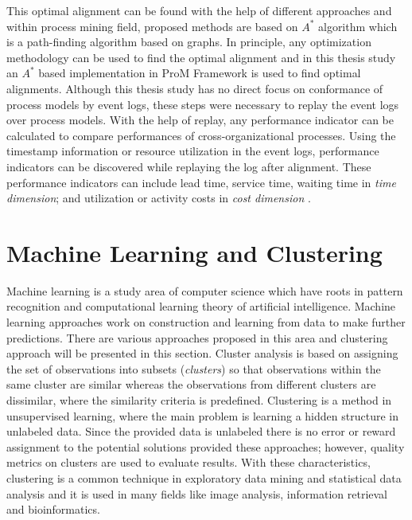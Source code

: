 This optimal alignment can be found with the help of different approaches and within process mining field, proposed methods \cite{adriansyah2011conformance} \cite{adriansyah2011towards} are based on $A^{*}$ algorithm which is a path-finding algorithm based on graphs. In principle, any optimization methodology can be used to find the optimal alignment and in this thesis study an $A^{*}$ based implementation in ProM Framework \cite{verbeek2010prom} is used to find optimal alignments. Although this thesis study has no direct focus on conformance of process models by event logs, these steps were necessary to replay the event logs over process models. With the help of replay, any performance indicator can be calculated to compare performances of cross-organizational processes. Using the timestamp information or resource utilization in the event logs, performance indicators can be discovered while replaying the log after alignment. These performance indicators can include lead time, service time, waiting time in \textit{time dimension}; and utilization or activity costs in \textit{cost dimension} \cite{van2011process}.

\section{Machine Learning and Clustering}
\label{sec:unsupervised-learning}
Machine learning is a study area of computer science which have roots in pattern recognition and computational learning theory of artificial intelligence. Machine learning approaches work on construction and learning from data to make further predictions. There are various approaches proposed in this area and clustering approach will be presented in this section. Cluster analysis is based on assigning the set of observations into subsets (\textit{clusters}) so that observations within the same cluster are similar whereas the observations from different clusters are dissimilar, where the similarity criteria is predefined. Clustering is a method in unsupervised learning, where the main problem is learning a hidden structure in unlabeled data. Since the provided data is unlabeled there is no error or reward assignment to the potential solutions provided these approaches; however, quality metrics on clusters are used to evaluate results. With these characteristics, clustering is a common technique in exploratory data mining and statistical data analysis and it is used in many fields like image analysis, information retrieval and bioinformatics.

